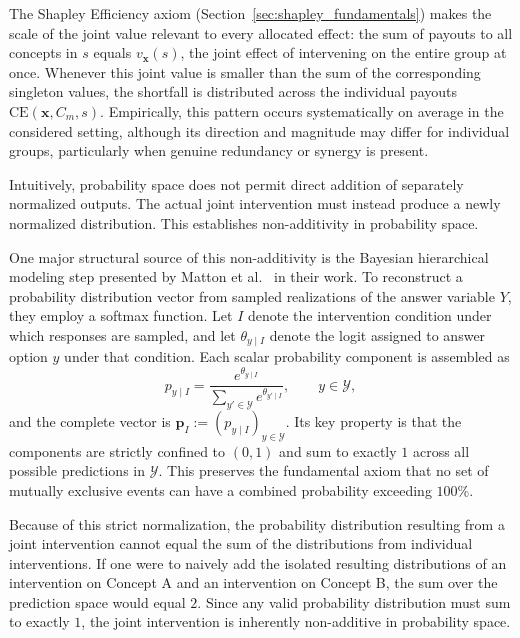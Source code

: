 The Shapley Efficiency axiom (Section~\ref{sec:shapley_fundamentals}) makes the scale of the joint value relevant to every allocated effect: the sum of payouts to all concepts in $s$ equals $v_{\mathbf{x}}(s)$, the joint effect of intervening on the entire group at once. Whenever this joint value is smaller than the sum of the corresponding singleton values, the shortfall is distributed across the individual payouts $\mathrm{CE}(\mathbf{x},C_m,s)$. Empirically, this pattern occurs systematically on average in the considered setting, although its direction and magnitude may differ for individual groups, particularly when genuine redundancy or synergy is present.

Intuitively, probability space does not permit direct addition of separately normalized outputs. The actual joint intervention must instead produce a newly normalized distribution. This establishes non-additivity in probability space.

One major structural source of this non-additivity is the Bayesian hierarchical modeling step presented by Matton et al.~\cite{mattonWalkTalkMeasuring2024} in their work. To reconstruct a probability distribution vector from sampled realizations of the answer variable $Y$, they employ a softmax function. Let $I$ denote the intervention condition under which responses are sampled, and let $\theta_{y\mid I}$ denote the logit assigned to answer option $y$ under that condition. Each scalar probability component is assembled as
\begin{equation}\label{eq:culprit_softmax}
	p_{y\mid I} = \frac{e^{\theta_{y\mid I}}}{\sum_{y' \in \mathcal{Y}} e^{\theta_{y'\mid I}}}, \qquad y \in \mathcal{Y},
\end{equation}
and the complete vector is $\mathbf{p}_{I}:=(p_{y\mid I})_{y\in\mathcal{Y}}$. Its key property is that the components are strictly confined to $(0,1)$ and sum to exactly $1$ across all possible predictions in $\mathcal{Y}$. This preserves the fundamental axiom that no set of mutually exclusive events can have a combined probability exceeding $100\%$.

Because of this strict normalization, the probability distribution resulting from a joint intervention cannot equal the sum of the distributions from individual interventions. If one were to naively add the isolated resulting distributions of an intervention on Concept A and an intervention on Concept B, the sum over the prediction space would equal $2$. Since any valid probability distribution must sum to exactly $1$, the joint intervention is inherently non-additive in probability space.

